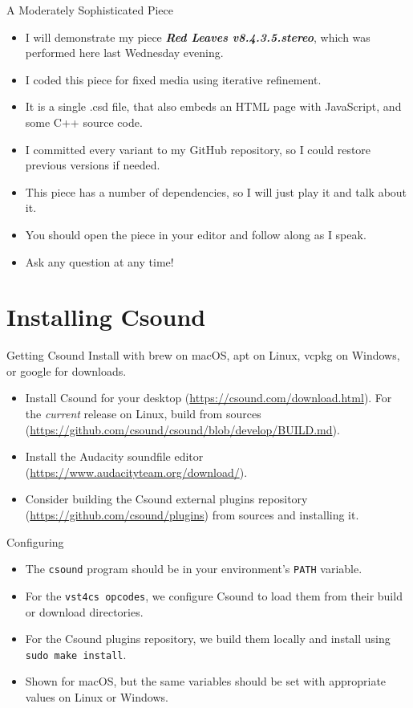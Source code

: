 \documentclass{beamer}
\begin{document}
\begin{frame}{A Moderately Sophisticated Piece}
\begin{itemize}
\item I will demonstrate my piece \emph{\textbf{Red Leaves v8.4.3.5.stereo}}, which was performed here last Wednesday evening.
\item I coded this piece for fixed media using iterative refinement.
\item It is a single .csd file, that also embeds an HTML page with JavaScript, and some C++ source code.
\item I committed every variant to my GitHub repository, so I could restore previous versions if needed.
\item This piece has a number of dependencies, so I will just play it and talk about it. 
\item You should open the piece in your editor and follow along as I speak. 
\item Ask any question at any time!
\end{itemize}
\end{frame}

\section{Installing Csound}
\begin{frame}{Getting Csound}
Install with brew on macOS, apt on Linux, vcpkg on Windows, or 
google for downloads.
\begin{itemize}
\item Install Csound for your desktop (\url{https://csound.com/download.html}). For the \emph{current} release on
Linux, build from sources
(\url{https://github.com/csound/csound/blob/develop/BUILD.md}).
\item Install the Audacity soundfile editor (\url{https://www.audacityteam.org/download/}).
\item Consider building the Csound external plugins repository (\url{https://github.com/csound/plugins}) from sources and installing it.
\end{itemize}
\end{frame}

\begin{frame}{Configuring}
\begin{itemize}
\item The \texttt{csound} program should be in your environment's \texttt{PATH} variable.
\item For the \texttt{vst4cs opcodes}, we configure Csound to load them from their build or download directories.
\item For the Csound plugins repository, we build them locally and install using \texttt{sudo make install}.
\item Shown for macOS, but the same variables should be set with appropriate values on Linux or Windows.
\end{itemize}
\end{frame}
\end{document}

